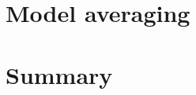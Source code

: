 \documentclass[10pt]{beamer}
\begin{document}
\section{Model averaging}
\frame{\sectionpage}














\section{Summary}
\frame{\sectionpage}
\end{document}
